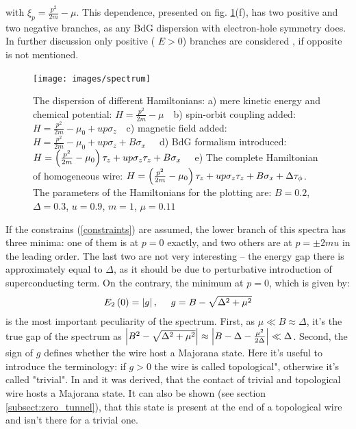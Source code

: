 with $ \xi_p =\frac{p^2}{2m}-\mu$. This dependence, presented on fig. \ref{fig:spectrum}(f), has two positive and two negative branches, as any BdG dispersion with electron-hole symmetry does. In further discussion only positive (	$ E>0 $) branches are considered $  $, if opposite is not mentioned.

\begin{figure}[H]
	\centering
	\texttt{[image: images/spectrum]}
	\caption{The dispersion of different Hamiltonians:
		 a)  mere kinetic energy and chemical potential: $ H =\frac{ p^2}{2m} - \mu ~~~$
		 b) spin-orbit coupling added: $ 	H = \frac{p^2}{2m}-\mu_0 + u p \sigma_z ~~~$
		 c) magnetic field added: $ 	H = \frac{p^2}{2m} 	-\mu_0  +u p \sigma_z  + B\sigma_x ~~~~~$
		 d) BdG formalism introduced: $ 	H = \left(\frac{p^2}{2m} 	-\mu_0 \right)\tau_z +u p \sigma_z \tau_z + B\sigma_x	~~~ $
		 e) The complete Hamiltonian of homogeneous wire: $ 	H = \left(\frac{p^2}{2m} 	-\mu_0 \right)\tau_z +u p \sigma_z \tau_z + B\sigma_x	+ \Delta\tau_\phi $.
		 The parameters of the Hamiltonians for the plotting are: $ B=0.2 $, $ \Delta=0.3 $, $ u=0.9 $, $ m = 1 $, $ \mu = 0.11 $ 
 }
	\label{fig:spectrum}
\end{figure}

If the constrains (\ref{constraints}) are assumed, the lower branch of this spectra has three minima: one of them is at $ p=0 $ exactly, and two others are at $ p = \pm 2mu $ in the leading order. The last two are not very interesting -- the energy gap  there is approximately equal to $ \Delta $, as it should be due to perturbative introduction of superconducting term. On the contrary, the minimum at $ p=0 $, which is given by\cite{Oreg_2010}:
\begin{gather}
	E_2\left(0\right)=\left|g\right|,~~~~g = B -\sqrt{\Delta^2+\mu^2}
\end{gather}
is the most important peculiarity of the spectrum. First, as $\mu\ll B \approx \Delta $, it's the true gap of the spectrum as $  \left|B^2 -\sqrt{\Delta^2+\mu^2}\right| \approx  \left|B-\Delta -\frac{\mu^2}{2\Delta}\right|\ll\Delta$. Second, the  sign of  $ g $ defines whether the wire host a Majorana state. Here it's useful to introduce the terminology: if $ g>0 $ the wire is called topological", otherwise it's called "trivial". In \cite{Oreg_2010} and \cite{Lutchyn_2010} it was derived, that the contact of trivial and topological wire hosts a Majorana state. It can also be shown (see section \ref{subsect:zero_tunnel}), that this state is present at the end of a topological wire and isn't there for a trivial one.

